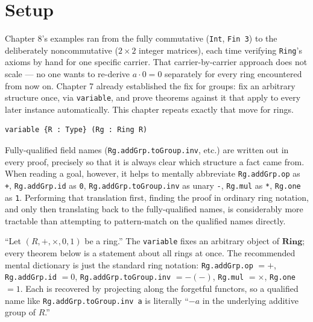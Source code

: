 \section{Setup}\label{sec:09-ring-theorems:01-setup:1}

Chapter 8's examples ran from the fully commutative (\texttt{Int}, \texttt{Fin 3}) to the deliberately noncommutative (\(2\times 2\) integer matrices), each time verifying \texttt{Ring}'s axioms by hand for one specific carrier. That carrier-by-carrier approach does not scale --- no one wants to re-derive \(a\cdot 0=0\) separately for every ring encountered from now on. Chapter 7 already established the fix for groups: fix an arbitrary structure once, via \texttt{variable}, and prove theorems against it that apply to every later instance automatically. This chapter repeats exactly that move for rings.

\begin{lstlisting}
variable {R : Type} (Rg : Ring R)
\end{lstlisting}

Fully-qualified field names (\texttt{Rg.addGrp.toGroup.inv}, etc.) are written out in every proof, precisely so that it is always clear which structure a fact came from. When reading a goal, however, it helps to mentally abbreviate \texttt{Rg.addGrp.op} as \texttt{+}, \texttt{Rg.addGrp.id} as \texttt{0}, \texttt{Rg.addGrp.toGroup.inv} as unary \texttt{-\allowbreak{}}, \texttt{Rg.mul} as \texttt{*}, \texttt{Rg.one} as \texttt{1}. Performing that translation first, finding the proof in ordinary ring notation, and only then translating back to the fully-qualified names, is considerably more tractable than attempting to pattern-match on the qualified names directly.

\begin{mathreading}

``Let \((R, +, \times, 0, 1)\) be a ring.'' The \texttt{variable} fixes an arbitrary object of \(\mathbf{Ring}\); every theorem below is a statement about all rings at once. The recommended mental dictionary is just the standard ring notation: \texttt{Rg.addGrp.op} \(= +\), \texttt{Rg.addGrp.id} \(= 0\), \texttt{Rg.addGrp.toGroup.inv} \(= -(-)\), \texttt{Rg.mul} \(= \times\), \texttt{Rg.one} \(= 1\). Each is recovered by projecting along the forgetful functors, so a qualified name like \texttt{Rg.addGrp.toGroup.inv a} is literally ``\(-a\) in the underlying additive group of \(R\).''

\end{mathreading}

